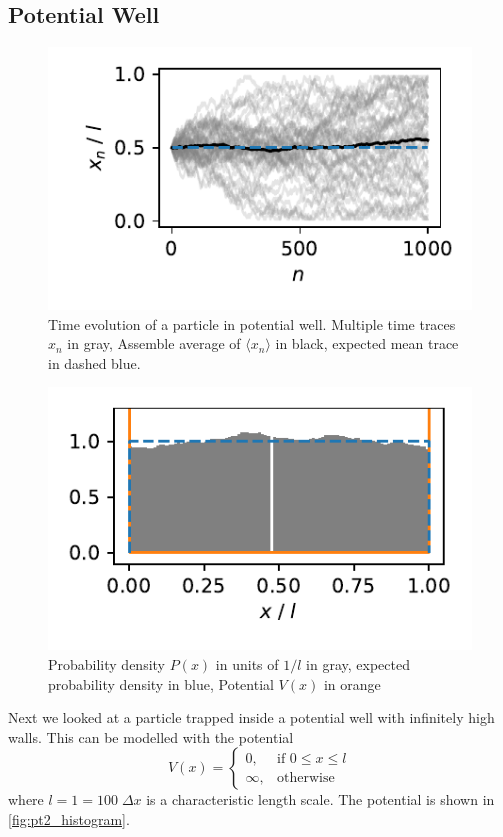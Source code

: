\documentclass[
    parskip=half, 
    twoside=false,
    twocolumn=true,
    fontsize=11pt,
]{scrarticle}
\begin{document}
\subsection{Potential Well}
\begin{figure}
    \centering
    \includegraphics{figures/02 time evolution.pdf}
    \caption{
        Time evolution of a particle in potential well.
        Multiple time traces $x_n$ in gray, Assemble average of $\langle x_n\rangle$ in black, expected mean trace in dashed blue.
    }
    \label{fig:pt2_trajectory}
\end{figure}
\begin{figure}
    \centering
    \includegraphics{figures/02 histogram.pdf}
    \caption{Probability density $P(x)$ in units of $1/l$ in gray, expected probability density in blue, Potential $V(x)$ in orange}
    \label{fig:pt2_histogram}
\end{figure}


Next we looked at a particle trapped inside a potential well with infinitely high walls.
This can be modelled with the potential
$$
V(x) = \begin{cases}
    0, &\text{if } 0\leq x\leq l\\
    \infty, &\text{otherwise}
\end{cases}
$$
where $l=1=100\;\Delta x$ is a characteristic length scale.
The potential is shown in \autoref{fig:pt2_histogram}.
\end{document}
